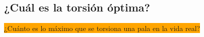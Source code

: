

\subsection{¿Cuál es la torsión óptima?}

\colorbox{orange}{¿Cuánto es lo máximo que se torsiona una pala en la vida real?}

